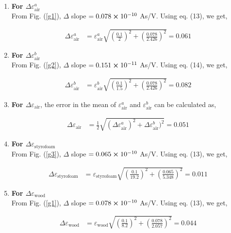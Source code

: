 \begin{enumerate}
  

    \item \textbf{For $\Delta \varepsilon_\text{air}^a$}\\
        From Fig. (\ref{g1}), $\Delta$ slope $=0.078\cross10^{-10}$ As/V. Using eq. (13), we get,
            
        \begin{align*}
            \Delta \varepsilon_\text{air}^{a} &= \varepsilon_\text{air}^{a}\sqrt{\left(\frac{0.1}{2}\right)^2 + \left(\frac{0.078}{\text{2.426}}\right)^2}=0.061
        \end{align*}

    \item \textbf{For $\Delta \varepsilon_\text{air}^b$}\\
        From Fig. (\ref{g2}), $\Delta$ slope $=0.151\cross10^{-11}$ As/V. Using eq. (14), we get,
                
        \begin{align*}
            \Delta \varepsilon_\text{air}^{b} &= \varepsilon_\text{air}^{b}\sqrt{\left(\frac{0.1}{1.5}\right)^2 + \left(\frac{0.078}{\text{2.426}}\right)^2}=0.082
        \end{align*}

    \item \textbf{For $\Delta \varepsilon_\text{air}$},
        the error in the mean of $\varepsilon_\text{air}^a$ and $\varepsilon_\text{air}^b$ can be calculated as,

        \begin{align*}
            \Delta \varepsilon_\text{air} &= \frac{1}{2}\sqrt{(\Delta \varepsilon_\text{air}^a)^2 + \Delta \varepsilon_\text{air}^b)^2}=0.051
        \end{align*}

    \item \textbf{For $\Delta \varepsilon_\text{styrofoam}$}\\
        From Fig. (\ref{g3}), $\Delta$ slope $=0.065\cross10^{-10}$ As/V. Using eq. (13), we get,
                
        \begin{align*}
            \Delta \varepsilon_\text{styrofoam} &= \varepsilon_\text{styrofoam}\sqrt{\left(\frac{0.1}{19.2}\right)^2 + \left(\frac{0.065}{\text{5.348}}\right)^2}=0.011
        \end{align*}

    \item \textbf{For $\Delta \varepsilon_\text{wood}$}\\
        From Fig. (\ref{g1}), $\Delta$ slope $=0.078\cross10^{-10}$ As/V. Using eq. (13), we get,
                
        \begin{align*}
            \Delta \varepsilon_\text{wood} &= \varepsilon_\text{wood}\sqrt{\left(\frac{0.1}{8.2}\right)^2 + \left(\frac{0.078}{\text{2.057}}\right)^2}=0.044
        \end{align*}

\end{enumerate}